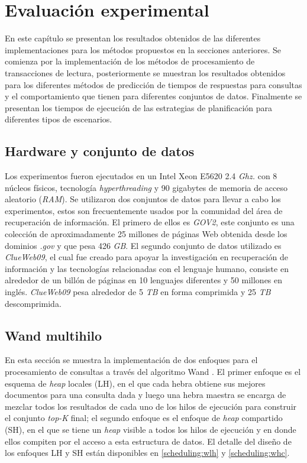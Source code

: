 \chapter{Evaluación experimental}
\label{cap:evaluacionexperimental}
En este capítulo se presentan los resultados obtenidos de las diferentes implementaciones para los métodos propuestos en la secciones anteriores. Se comienza por la implementación de los métodos de procesamiento de transacciones de lectura, posteriormente se muestran los resultados obtenidos para los diferentes métodos de predicción de tiempos de respuestas para consultas y el comportamiento que tienen para diferentes conjuntos de datos. Finalmente se presentan los tiempos de ejecución de las estrategias de planificación para diferentes tipos de escenarios.

\section{Hardware y conjunto de datos}
\label{evaluacionexperimental:hardwareydatos}
Los experimentos fueron ejecutados en un Intel Xeon E5620 2.4 \textit{Ghz.} con 8 núcleos físicos, tecnología \textit{hyperthreading} y 90 gigabytes de memoria de acceso aleatorio (\textit{RAM}). Se utilizaron dos conjuntos de datos para llevar a cabo los experimentos, estos son frecuentemente usados por la comunidad del área de recuperación de información. El primero de ellos es \textit{GOV2}, este conjunto es una colección de aproximadamente 25 millones de páginas Web obtenida desde los dominios \textit{.gov} y que pesa 426 \textit{GB}. El segundo conjunto de datos utilizado es \textit{ClueWeb09}, el cual fue creado para apoyar la investigación en recuperación de información y las tecnologías relacionadas con el lenguaje humano, consiste en alrededor de un billón de páginas en 10 lenguajes diferentes y 50 millones en inglés. \textit{ClueWeb09} pesa alrededor de 5 \textit{TB} en forma comprimida y 25 \textit{TB} descomprimida. 

\section{Wand multihilo}
\label{evaluacionexperimental:wm}
En esta sección se muestra la implementación de dos enfoques para el procesamiento de consultas a través del algoritmo Wand \citep{Broder:2003}. El primer enfoque es el esquema de \textit{heap} locales (LH), en el que cada hebra obtiene sus mejores documentos para una consulta dada y luego una hebra maestra se encarga de mezclar todos los resultados de cada uno de los hilos de ejecución para construir el conjunto \textit{top-K} final; el segundo enfoque es el enfoque de \textit{heap} compartido (SH), en el que se tiene un \textit{heap} visible a todos los hilos de ejecución y en donde ellos compiten por el acceso a esta estructura de datos. El detalle del diseño de los enfoques LH y SH están disponibles en \ref{scheduling:wlh} y \ref{scheduling:whc}. 

